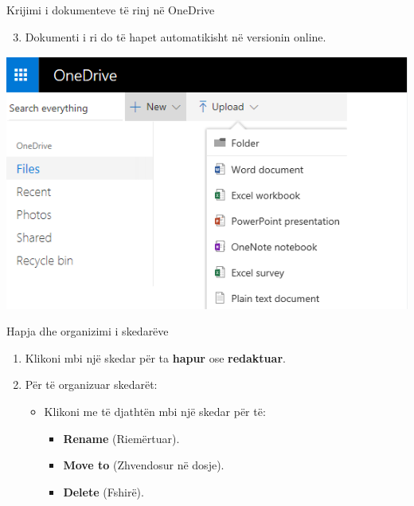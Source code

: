 \documentclass[
  ignorenonframetext,
]{beamer}
\providecommand{\tightlist}{%
  \setlength{\itemsep}{0pt}\setlength{\parskip}{0pt}}
\begin{document}
\begin{frame}{Krijimi i dokumenteve të rinj në OneDrive}
\label{krijimi-i-dokumenteve-tuxeb-rinj-nuxeb-onedrive-1}
\begin{enumerate}
\setcounter{enumi}{2}
\tightlist
\item
  Dokumenti i ri do të hapet automatikisht në versionin online.
\end{enumerate}

\includegraphics{./images/onedrive4.png}
\end{frame}

\begin{frame}{Hapja dhe organizimi i skedarëve}
\label{hapja-dhe-organizimi-i-skedaruxebve}
\begin{enumerate}
\item
  Klikoni mbi një skedar për ta \textbf{hapur} ose \textbf{redaktuar}.
\item
  Për të organizuar skedarët:

  \begin{itemize}
  \item
    Klikoni me të djathtën mbi një skedar për të:

    \begin{itemize}
    \item
      \textbf{Rename} (Riemërtuar).
    \item
      \textbf{Move to} (Zhvendosur në dosje).
    \item
      \textbf{Delete} (Fshirë).
    \end{itemize}
  \end{itemize}
\end{enumerate}
\end{frame}
\end{document}
